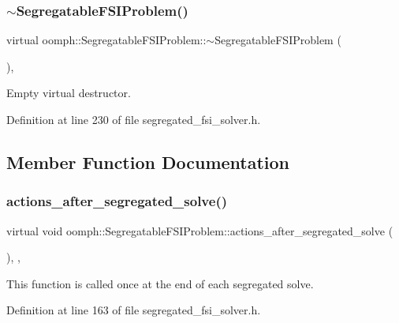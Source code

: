 \subsubsection{\texorpdfstring{$\sim$\+Segregatable\+F\+S\+I\+Problem()}{~SegregatableFSIProblem()}}
{\footnotesize\ttfamily virtual oomph\+::\+Segregatable\+F\+S\+I\+Problem\+::$\sim$\+Segregatable\+F\+S\+I\+Problem (\begin{DoxyParamCaption}{ }\end{DoxyParamCaption})\hspace{0.3cm}{\ttfamily [inline]}, {\ttfamily [virtual]}}



Empty virtual destructor. 



Definition at line 230 of file segregated\+\_\+fsi\+\_\+solver.\+h.



\subsection{Member Function Documentation}
\mbox{\label{classoomph_1_1SegregatableFSIProblem_a284fb37276735a73bca0467fa2e44909}} 
\subsubsection{\texorpdfstring{actions\+\_\+after\+\_\+segregated\+\_\+solve()}{actions\_after\_segregated\_solve()}}
{\footnotesize\ttfamily virtual void oomph\+::\+Segregatable\+F\+S\+I\+Problem\+::actions\+\_\+after\+\_\+segregated\+\_\+solve (\begin{DoxyParamCaption}{ }\end{DoxyParamCaption})\hspace{0.3cm}{\ttfamily [inline]}, {\ttfamily [protected]}, {\ttfamily [virtual]}}



This function is called once at the end of each segregated solve. 



Definition at line 163 of file segregated\+\_\+fsi\+\_\+solver.\+h.



